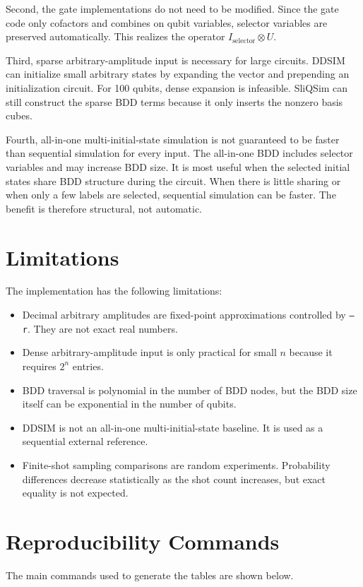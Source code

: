 \documentclass[sigconf,nonacm]{acmart}
\begin{document}
Second, the gate implementations do not need to be modified. Since the gate code only cofactors and combines on qubit variables, selector variables are preserved automatically. This realizes the operator $I_{\mathrm{selector}}\otimes U$.

Third, sparse arbitrary-amplitude input is necessary for large circuits. DDSIM can initialize small arbitrary states by expanding the vector and prepending an initialization circuit. For 100 qubits, dense expansion is infeasible. SliQSim can still construct the sparse BDD terms because it only inserts the nonzero basis cubes.

Fourth, all-in-one multi-initial-state simulation is not guaranteed to be faster than sequential simulation for every input. The all-in-one BDD includes selector variables and may increase BDD size. It is most useful when the selected initial states share BDD structure during the circuit. When there is little sharing or when only a few labels are selected, sequential simulation can be faster. The benefit is therefore structural, not automatic.

\section{Limitations}
The implementation has the following limitations:
\begin{itemize}
  \item Decimal arbitrary amplitudes are fixed-point approximations controlled by \texttt{--r}. They are not exact real numbers.
  \item Dense arbitrary-amplitude input is only practical for small $n$ because it requires $2^n$ entries.
  \item BDD traversal is polynomial in the number of BDD nodes, but the BDD size itself can be exponential in the number of qubits.
  \item DDSIM is not an all-in-one multi-initial-state baseline. It is used as a sequential external reference.
  \item Finite-shot sampling comparisons are random experiments. Probability differences decrease statistically as the shot count increases, but exact equality is not expected.
\end{itemize}

\section{Reproducibility Commands}
The main commands used to generate the tables are shown below.
\end{document}
